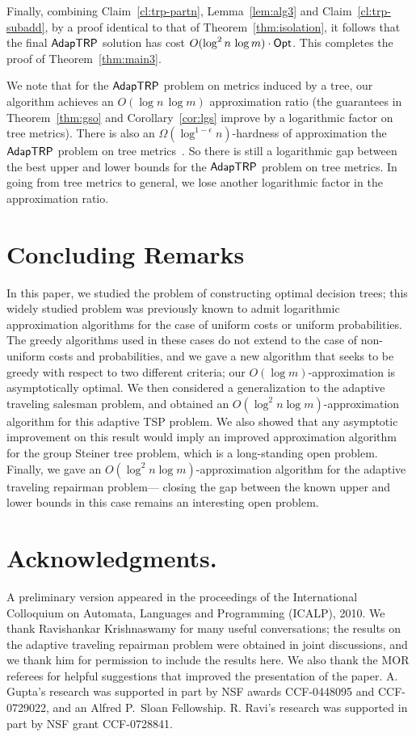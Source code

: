 \documentclass[11pt]{article}
\def\opt{{\sf Opt}\xspace}
\def\strp{\ensuremath{{\sf AdapTRP}}\xspace}
\begin{document}
Finally, combining Claim~\ref{cl:trp-partn}, Lemma~\ref{lem:alg3} and Claim~\ref{cl:trp-subadd}, 
by a proof identical to that of Theorem~\ref{thm:isolation}, it follows that the final \strp solution has cost $O(\log^2n\,\log m)\cdot \opt$. This completes the proof of 
Theorem~\ref{thm:main3}. 
\medskip

We note that for the \strp problem on metrics induced by a tree, our algorithm achieves an $O(\log n\,\log m)$ approximation ratio (the guarantees in Theorem~\ref{thm:gso} and Corollary~\ref{cor:lgs} improve by a logarithmic  factor on tree metrics). There is also an $\Omega(\log^{1-\epsilon} n)$-hardness of
approximation the \strp problem on tree metrics~\cite{Vish-thesis}. So there is still a logarithmic gap between the best upper and lower bounds for the \strp problem on tree metrics. In going from tree metrics to general, we lose another logarithmic  factor in the approximation ratio. 






\section{Concluding Remarks}

In this paper, we studied the problem of constructing optimal decision
trees;  this widely studied problem was previously known to admit logarithmic
approximation algorithms for the case of uniform costs or uniform
probabilities. The greedy algorithms used in these cases do not extend
to the case of non-uniform costs and probabilities, and
we gave a new algorithm that seeks to be greedy with respect to two
different criteria; our $O(\log m)$-approximation is
asymptotically optimal. We then considered a generalization to the adaptive traveling salesman
problem, and obtained an
$O(\log^2 n \log m)$-approximation algorithm for this adaptive TSP problem. We also showed
that any asymptotic improvement on this result would imply an improved
approximation algorithm for the group Steiner tree problem, which is a long-standing
open problem. Finally, we gave an $O(\log^2 n \log m)$-approximation algorithm for the adaptive
traveling repairman problem--- closing the 
 gap
between the known upper and lower bounds in this case remains an 
interesting open problem.



\section*{Acknowledgments.}
A preliminary version appeared in the proceedings of the International Colloquium on Automata, Languages and Programming (ICALP), 2010. We thank Ravishankar Krishnaswamy for many useful conversations; the results on the adaptive traveling repairman problem were obtained in joint discussions, and we thank him for permission to include the results here. We also thank the MOR referees for helpful suggestions that improved the presentation of the paper. 
A. Gupta's research was supported in part by NSF awards CCF-0448095 and CCF-0729022, and an Alfred P.~Sloan Fellowship. R. Ravi's  research was supported in part by NSF grant
  CCF-0728841.
\end{document}

